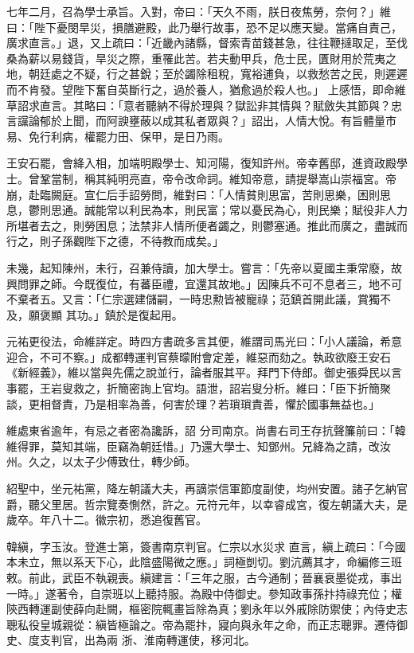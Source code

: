\begin{pinyinscope}
 七年二月，召為學士承旨。入對，帝曰：「天久不雨，朕日夜焦勞，奈何？」維曰：「陛下憂閔旱災，損膳避殿，此乃舉行故事，恐不足以應天變。當痛自責己，廣求直言。」退，又上疏曰：「近畿內諸縣，督索青苗錢甚急，往往鞭撻取足，至伐桑為薪以易錢貨，旱災之際，重罹此苦。若夫動甲兵，危士民，匱財用於荒夷之地，朝廷處之不疑，行之甚銳；至於蠲除租稅，寬裕逋負，以救愁苦之民，則遲遲而不肯發。望陛下奮自英斷行之，過於養人，猶愈過於殺人也。」
 上感悟，即命維草詔求直言。其略曰：「意者聽納不得於理與？獄訟非其情與？賦斂失其節與？忠言讜論郁於上聞，而阿諛壅蔽以成其私者眾與？」詔出，人情大悅。有旨體量市易、免行利病，權罷力田、保甲，是日乃雨。



 王安石罷，會絳入相，加端明殿學士、知河陽，復知許州。帝幸舊邸，進資政殿學士。曾鞏當制，稱其純明亮直，帝令改命詞。維知帝意，請提舉嵩山崇福宮。帝崩，赴臨闕庭。宣仁后手詔勞問，維對曰：「人情貧則思富，苦則思樂，困則思
 息，鬱則思通。誠能常以利民為本，則民富；常以憂民為心，則民樂；賦役非人力所堪者去之，則勞困息；法禁非人情所便者蠲之，則鬱塞通。推此而廣之，盡誠而行之，則子孫觀陛下之德，不待教而成矣。」



 未幾，起知陳州，未行，召兼侍讀，加大學士。嘗言：「先帝以夏國主秉常廢，故興問罪之師。今既復位，有蕃臣禮，宜還其故地。」因陳兵不可不息者三，地不可不棄者五。又言：「仁宗選建儲嗣，一時忠勲皆被寵祿；范鎮首開此議，賞獨不及，願褒顯
 其功。」鎮於是復起用。



 元祐更役法，命維詳定。時四方書疏多言其便，維謂司馬光曰：「小人議論，希意迎合，不可不察。」成都轉運判官蔡曚附會定差，維惡而劾之。執政欲廢王安石《新經義》，維以當與先儒之說並行，論者服其平。拜門下侍郎。御史張舜民以言事罷，王岩叟救之，折簡密詢上官均。語泄，詔岩叟分析。維曰：「臣下折簡聚談，更相督責，乃是相率為善，何害於理？若瑣瑣責善，懼於國事無益也。」



 維處東省逾年，有忌之者密為讒訴，詔
 分司南京。尚書右司王存抗聲簾前曰：「韓維得罪，莫知其端，臣竊為朝廷惜。」乃還大學士、知鄧州。兄絳為之請，改汝州。久之，以太子少傅致仕，轉少師。



 紹聖中，坐元祐黨，降左朝議大夫，再謫崇信軍節度副使，均州安置。諸子乞納官爵，聽父里居。哲宗覽奏惻然，許之。元符元年，以幸睿成宮，復左朝議大夫，是歲卒。年八十二。徽宗初，悉追復舊官。



 韓縝，字玉汝。登進士第，簽書南京判官。仁宗以水災求
 直言，縝上疏曰：「今國本未立，無以系天下心，此陰盛陽微之應。」詞極剴切。劉沆薦其才，命編修三班敕。前此，武臣不執親喪。縝建言：「三年之服，古今通制；晉襄衰墨從戎，事出一時。」遂著令，自崇班以上聽持服。為殿中侍御史。參知政事孫抃持祿充位；權陝西轉運副使薛向赴闕，樞密院輒畫旨除為真；劉永年以外戚除防禦使；內侍史志聰私役皇城親從：縝皆極論之。帝為罷抃，寢向與永年之命，而正志聰罪。遷侍御史、度支判官，出為兩
 浙、淮南轉運使，移河北。




\end{pinyinscope}
